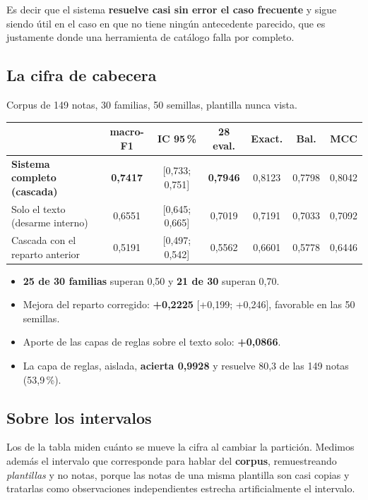 \documentclass[11pt,a4paper]{article}
\begin{document}
Es decir que el sistema \textbf{resuelve casi sin error el caso frecuente} y sigue siendo útil en el
caso en que no tiene ningún antecedente parecido, que es justamente donde una herramienta de catálogo
falla por completo.

\subsection*{La cifra de cabecera}

Corpus de 149 notas, 30 familias, 50 semillas, plantilla nunca vista.

\begin{center}
\small
\begin{tabular}{lcccccc}
\toprule
 & \textbf{macro-F1} & \textbf{IC 95\,\%} & \textbf{28 eval.} & \textbf{Exact.} & \textbf{Bal.} & \textbf{MCC} \\
\midrule
\textbf{Sistema completo (cascada)} & \textbf{0,7417} & [0,733; 0,751] & \textbf{0,7946} & 0,8123 & 0,7798 & 0,8042 \\
Solo el texto (desarme interno)     & 0,6551 & [0,645; 0,665] & 0,7019 & 0,7191 & 0,7033 & 0,7092 \\
Cascada con el reparto anterior     & 0,5191 & [0,497; 0,542] & 0,5562 & 0,6601 & 0,5778 & 0,6446 \\
\bottomrule
\end{tabular}
\end{center}

\begin{itemize}\setlength{\itemsep}{0.1em}
  \item \textbf{25 de 30 familias} superan 0,50 y \textbf{21 de 30} superan 0,70.
  \item Mejora del reparto corregido: \textbf{+0,2225} [+0,199; +0,246], favorable en las 50 semillas.
  \item Aporte de las capas de reglas sobre el texto solo: \textbf{+0,0866}.
  \item La capa de reglas, aislada, \textbf{acierta 0,9928} y resuelve 80,3 de las 149 notas (53,9\,\%).
\end{itemize}

\subsection*{Sobre los intervalos}

Los de la tabla miden cuánto se mueve la cifra al cambiar la partición. Medimos además el intervalo
que corresponde para hablar del \textbf{corpus}, remuestreando \emph{plantillas} y no notas, porque
las notas de una misma plantilla son casi copias y tratarlas como observaciones independientes
estrecha artificialmente el intervalo.
\end{document}
